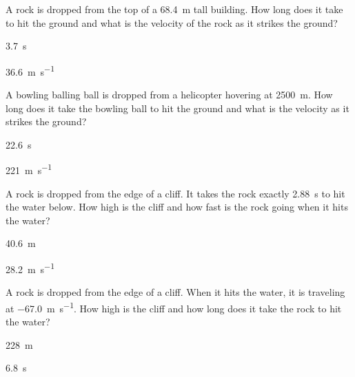 \begin{question}[ID=falling-C-Q01,topic=kinematics,difficulty=C]
    A rock is dropped from the top of a \SI{68.4}{\meter} tall
        building.
    How long does it take to hit the ground and what is the
        velocity of the rock as it strikes the ground?
\end{question}
\begin{solution}
    \begin{enumerate*}
        \item \SI{3.7}{\second}
        \item \SI{36.6}{\meter\per\second}
    \end{enumerate*}
\end{solution}


\begin{question}[ID=falling-C-Q02,topic=kinematics,difficulty=C]
    A bowling balling ball is dropped from a helicopter hovering
        at \SI{2500}{\meter}.
    How long does it take the bowling ball to hit the ground
        and what is the velocity as it strikes the ground?
\end{question}
\begin{solution}
    \begin{enumerate*}
        \item \SI{22.6}{\second}
        \item \SI{221}{\meter\per\second}
    \end{enumerate*}
\end{solution}


\begin{question}[ID=falling-C-Q03,topic=kinematics,difficulty=C]
    A rock is dropped from the edge of a cliff.
    It takes the rock exactly \SI{2.88}{\second}    
        to hit the water below.
    How high is the cliff and how fast is the rock going
        when it hits the water?
\end{question}
\begin{solution}
    \begin{enumerate*}
        \item \SI{40.6}{\meter}
        \item \SI{28.2}{\meter\per\second}
    \end{enumerate*}
\end{solution}


\begin{question}[ID=falling-C-Q04,topic=kinematics,difficulty=C]
    A rock is dropped from the edge of a cliff.
    When it hits the water, it is traveling at
        \SI{-67.0}{\meter\per\second}.
    How high is the cliff and how long does it take
        the rock to hit the water?
\end{question}
\begin{solution}
    \begin{enumerate*}
        \item \SI{228}{\meter}
        \item \SI{6.8}{\second}
    \end{enumerate*}
\end{solution}


\endinput

